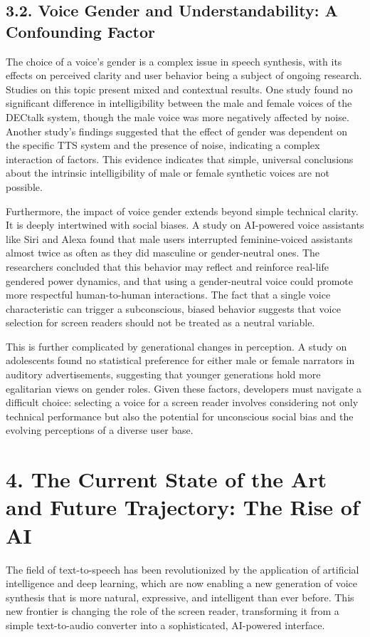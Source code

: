 \subsection{3.2. Voice Gender and Understandability: A Confounding Factor}
The choice of a voice's gender is a complex issue in speech synthesis,
with its effects on perceived clarity and user behavior being a subject
of ongoing research. Studies on this topic present mixed and contextual
results. One study found no significant difference in intelligibility
between the male and female voices of the DECtalk system, though the
male voice was more negatively affected by noise.\supercite{20} Another study's
findings suggested that the effect of gender was dependent on the
specific TTS system and the presence of noise, indicating a complex
interaction of factors.\supercite{21} This evidence indicates that simple,
universal conclusions about the intrinsic intelligibility of male or
female synthetic voices are not possible.

Furthermore, the impact of voice gender extends beyond simple technical
clarity. It is deeply intertwined with social biases. A study on
AI-powered voice assistants like Siri and Alexa found that male users
interrupted feminine-voiced assistants almost twice as often as they did
masculine or gender-neutral ones.\supercite{22} The researchers concluded that
this behavior may reflect and reinforce real-life gendered power
dynamics, and that using a gender-neutral voice could promote more
respectful human-to-human interactions.\supercite{22} The fact that a single voice
characteristic can trigger a subconscious, biased behavior suggests that
voice selection for screen readers should not be treated as a neutral
variable.

This is further complicated by generational changes in perception. A
study on adolescents found no statistical preference for either male or
female narrators in auditory advertisements, suggesting that younger
generations hold more egalitarian views on gender roles.\supercite{23} Given these
factors, developers must navigate a difficult choice: selecting a voice
for a screen reader involves considering not only technical performance
but also the potential for unconscious social bias and the evolving
perceptions of a diverse user base.

\section{4. The Current State of the Art and Future Trajectory: The Rise of AI}
The field of text-to-speech has been revolutionized by the application
of artificial intelligence and deep learning, which are now enabling a
new generation of voice synthesis that is more natural, expressive, and
intelligent than ever before. This new frontier is changing the role of
the screen reader, transforming it from a simple text-to-audio converter
into a sophisticated, AI-powered interface.

